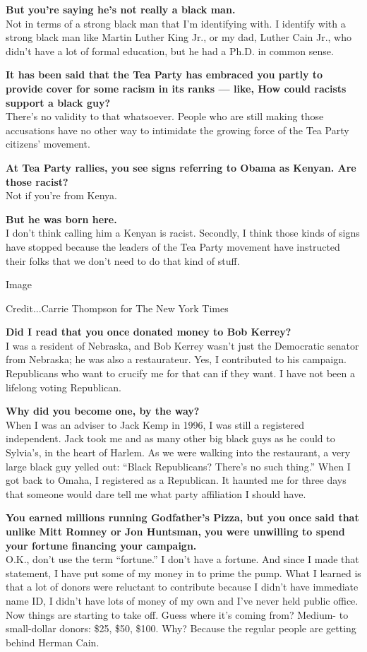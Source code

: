 \textbf{But you're saying he's not really a black man.}\\
Not in terms of a strong black man that I'm identifying with. I identify
with a strong black man like Martin Luther King Jr., or my dad, Luther
Cain Jr., who didn't have a lot of formal education, but he had a Ph.D.
in common sense.

\textbf{It has been said that the Tea Party has embraced you partly to
provide cover for some racism in its ranks --- like, How could racists
support a black guy?}\\
There's no validity to that whatsoever. People who are still making
those accusations have no other way to intimidate the growing force of
the Tea Party citizens' movement.

\textbf{At Tea Party rallies, you see signs referring to Obama as
Kenyan. Are those racist?}\\
Not if you're from Kenya.

\textbf{But he was born here.}\\
I don't think calling him a Kenyan is racist. Secondly, I think those
kinds of signs have stopped because the leaders of the Tea Party
movement have instructed their folks that we don't need to do that kind
of stuff.

Image

Credit...Carrie Thompson for The New York Times

\textbf{Did I read that you once donated money to Bob Kerrey?}\\
I was a resident of Nebraska, and Bob Kerrey wasn't just the Democratic
senator from Nebraska; he was also a restaurateur. Yes, I contributed to
his campaign. Republicans who want to crucify me for that can if they
want. I have not been a lifelong voting Republican.

\textbf{Why did you become one, by the way?}\\
When I was an adviser to Jack Kemp in 1996, I was still a registered
independent. Jack took me and as many other big black guys as he could
to Sylvia's, in the heart of Harlem. As we were walking into the
restaurant, a very large black guy yelled out: ``Black Republicans?
There's no such thing.'' When I got back to Omaha, I registered as a
Republican. It haunted me for three days that someone would dare tell me
what party affiliation I should have.

\textbf{You earned millions running Godfather's Pizza, but you once said
that unlike Mitt Romney or Jon Huntsman, you were unwilling to spend
your fortune financing your campaign.}\\
O.K., don't use the term ``fortune.'' I don't have a fortune. And since
I made that statement, I have put some of my money in to prime the pump.
What I learned is that a lot of donors were reluctant to contribute
because I didn't have immediate name ID, I didn't have lots of money of
my own and I've never held public office. Now things are starting to
take off. Guess where it's coming from? Medium- to small-dollar donors:
\$25, \$50, \$100. Why? Because the regular people are getting behind
Herman Cain.


